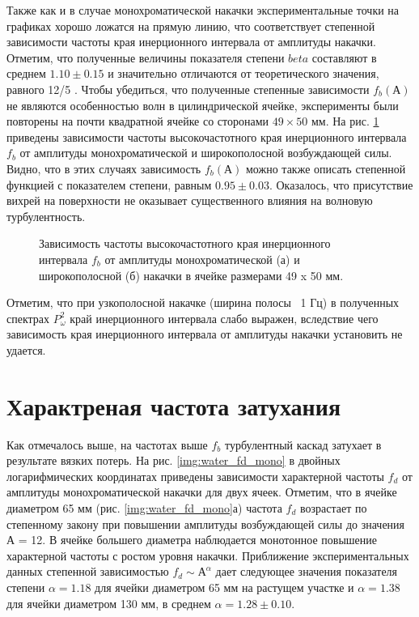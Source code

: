 Также как и в случае монохроматической накачки экспериментальные точки на графиках хорошо ложатся на прямую линию, что соответствует степенной зависимости частоты края инерционного интервала от амплитуды накачки. Отметим, что полученные величины показателя степени $beta$ составляют в среднем $1.10 \pm 0.15$ и значительно отличаются от теоретического значения, равного 12/5 \cite{Ryzhenkova}.
Чтобы убедиться, что полученные степенные зависимости $f_b(А)$ не являются особенностью волн в цилиндрической 
ячейке, эксперименты были повторены на почти квадратной ячейке со сторонами $49 \times 50$ мм. На рис. \ref{img:water_fb_rect} приведены зависимости частоты высокочастотного края инерционного интервала $f_b$ от амплитуды монохроматической и широкополосной возбуждающей силы. Видно, что в этих случаях зависимость $f_b(А)$ можно также описать степенной функцией с показателем степени, равным $0.95 \pm 0.03$. Оказалось, что присутствие вихрей на поверхности не оказывает существенного влияния на волновую турбулентность.
\begin{figure}[ht]
  \begin{minipage}[ht]{0.49\linewidth}
  \end{minipage}
  \hfill
  \begin{minipage}[ht]{0.49\linewidth}
  \end{minipage}
  \caption{Зависимость частоты высокочастотного края инерционного интервала $f_b$ от амплитуды монохроматической (а) и широкополосной (б) накачки в ячейке размерами 49 x 50 мм.}
  \label{img:water_fb_rect}  
\end{figure}

Отметим, что при узкополосной накачке (ширина полосы ~1 Гц) в полученных спектрах $P^2_\omega$ край инерционного интервала слабо выражен, вследствие чего зависимость края инерционного интервала от амплитуды накачки установить не удается.

\section{Характреная частота затухания}%
Как отмечалось выше, на частотах выше $f_b$ турбулентный каскад затухает в результате вязких потерь. На рис. \ref{img:water_fd_mono} в двойных логарифмических координатах приведены зависимости характерной частоты $f_d$ от амплитуды монохроматической накачки для двух ячеек. Отметим, что в ячейке диаметром 65 мм (рис. \ref{img:water_fd_mono}а) частота $f_d$ возрастает по степенному закону при повышении амплитуды возбуждающей силы до значения А = 12. В ячейке большего диаметра наблюдается монотонное повышение характерной частоты с ростом уровня накачки. Приближение экспериментальных данных степенной зависимостью $f_d \sim А^\alpha$ дает следующее значения показателя степени $\alpha = 1.18$ для ячейки диаметром 65 мм на растущем участке и $\alpha = 1.38$ для ячейки диаметром 130 мм, в среднем $\alpha = 1.28 \pm 0.10$.

